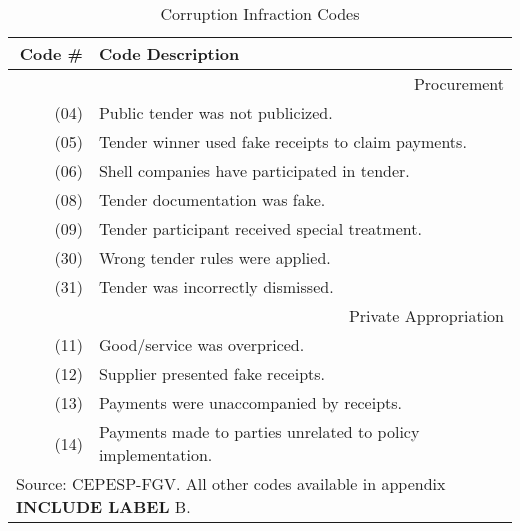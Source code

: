 \documentclass[11pt]{article}
\author{Andre Assumpcao}
\newcommand\T{\rule{0pt}{2.6ex}}       %
\newcommand\B{\rule[-1.2ex]{0pt}{0pt}} %
\begin{document}
\begin{table}[!htbp]
  \caption{\label{tab:corruptioncodes} Corruption Infraction Codes}
  \centering
  \small
  \begin{tabular}{r|l}
  \hline

  \hline
  Code \# & Code Description                                          \T \B \\
  \hline
  \multicolumn{2}{r}{Procurement}                                     \T \B \\
  \hline
  (04) & Public tender was not publicized.                            \T \B \\
  (05) & Tender winner used fake receipts to claim payments.          \T \B \\
  (06) & Shell companies have participated in tender.                 \T \B \\
  (08) & Tender documentation was fake.                               \T \B \\
  (09) & Tender participant received special treatment.               \T \B \\
  (30) & Wrong tender rules were applied.                             \T \B \\
  (31) & Tender was incorrectly dismissed.                            \T \B \\
  \hline
  \multicolumn{2}{r}{Private Appropriation}                           \T \B \\
  \hline
  (11) & Good/service was overpriced.                                 \T \B \\
  (12) & Supplier presented fake receipts.                            \T \B \\
  (13) & Payments were unaccompanied by receipts.                     \T \B \\
  (14) & Payments made to parties unrelated to policy implementation. \T \B \\
  \hline

  \hline
  \multicolumn{2}{l}{Source: CEPESP-FGV. All other codes available in appendix {\bf INCLUDE LABEL} B.} \T
  \end{tabular}
\end{table}
\end{document}
